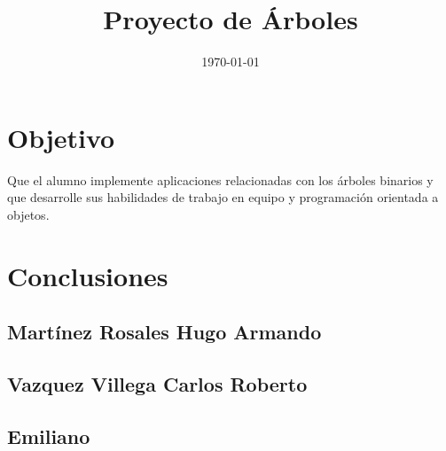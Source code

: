 \documentclass[12pt]{article}
\title{Proyecto de Árboles}
\author{}
\date{\today}
\begin{document}
	
	\maketitle
	
	\section*{Objetivo}
	Que el alumno implemente aplicaciones relacionadas con los árboles binarios y que desarrolle sus habilidades de trabajo en equipo y programación orientada a objetos.
	
	\section*{Conclusiones}
	
	\subsection*{Martínez Rosales Hugo Armando}
	
	\subsection*{Vazquez Villega Carlos Roberto }
	
	\subsection*{Emiliano }
	
	
\end{document}
